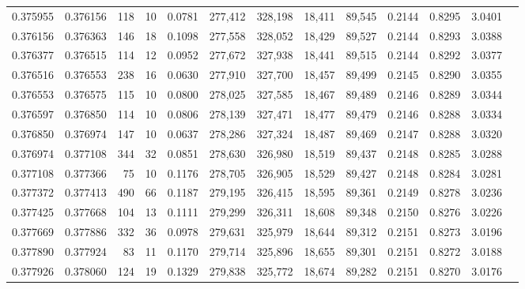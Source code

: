 \begin{tabular}{rrrrrrrrrrrrr}
0.375955 & 0.376156 &   118 &  10 &                                     0.0781 & 277,412 & 328,198 &  18,411 &  89,545 & 0.2144 & 0.8295 & 3.0401 \\
0.376156 & 0.376363 &   146 &  18 &                                     0.1098 & 277,558 & 328,052 &  18,429 &  89,527 & 0.2144 & 0.8293 & 3.0388 \\
0.376377 & 0.376515 &   114 &  12 &                                     0.0952 & 277,672 & 327,938 &  18,441 &  89,515 & 0.2144 & 0.8292 & 3.0377 \\
0.376516 & 0.376553 &   238 &  16 &                                     0.0630 & 277,910 & 327,700 &  18,457 &  89,499 & 0.2145 & 0.8290 & 3.0355 \\
0.376553 & 0.376575 &   115 &  10 &                                     0.0800 & 278,025 & 327,585 &  18,467 &  89,489 & 0.2146 & 0.8289 & 3.0344 \\
0.376597 & 0.376850 &   114 &  10 &                                     0.0806 & 278,139 & 327,471 &  18,477 &  89,479 & 0.2146 & 0.8288 & 3.0334 \\
0.376850 & 0.376974 &   147 &  10 &                                     0.0637 & 278,286 & 327,324 &  18,487 &  89,469 & 0.2147 & 0.8288 & 3.0320 \\
0.376974 & 0.377108 &   344 &  32 &                                     0.0851 & 278,630 & 326,980 &  18,519 &  89,437 & 0.2148 & 0.8285 & 3.0288 \\
0.377108 & 0.377366 &    75 &  10 &                                     0.1176 & 278,705 & 326,905 &  18,529 &  89,427 & 0.2148 & 0.8284 & 3.0281 \\
0.377372 & 0.377413 &   490 &  66 &                                     0.1187 & 279,195 & 326,415 &  18,595 &  89,361 & 0.2149 & 0.8278 & 3.0236 \\
0.377425 & 0.377668 &   104 &  13 &                                     0.1111 & 279,299 & 326,311 &  18,608 &  89,348 & 0.2150 & 0.8276 & 3.0226 \\
0.377669 & 0.377886 &   332 &  36 &                                     0.0978 & 279,631 & 325,979 &  18,644 &  89,312 & 0.2151 & 0.8273 & 3.0196 \\
0.377890 & 0.377924 &    83 &  11 &                                     0.1170 & 279,714 & 325,896 &  18,655 &  89,301 & 0.2151 & 0.8272 & 3.0188 \\
0.377926 & 0.378060 &   124 &  19 &                                     0.1329 & 279,838 & 325,772 &  18,674 &  89,282 & 0.2151 & 0.8270 & 3.0176 \\

\end{tabular}
